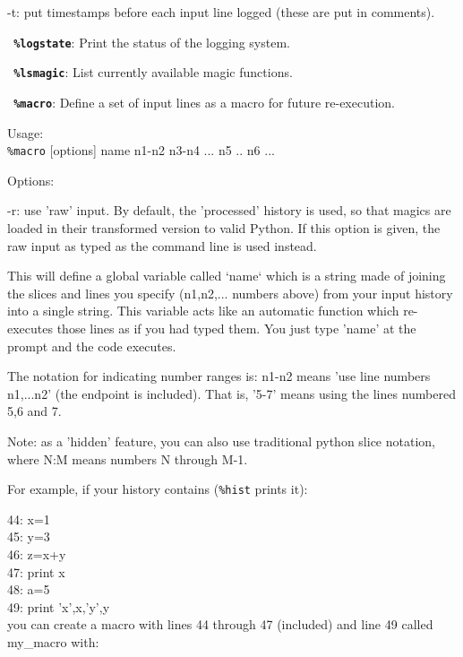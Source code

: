           -t: put timestamps before each input line logged (these are put in
          comments).

\bigskip
\texttt{\textbf{ \%logstate}}:
	Print the status of the logging system.

\bigskip
\texttt{\textbf{ \%lsmagic}}:
	List currently available magic functions.

\bigskip
\texttt{\textbf{ \%macro}}:
	Define a set of input lines as a macro for future re-execution.

        Usage:\\
          \texttt{\%macro} [options] name n1-n2 n3-n4 ... n5 .. n6 ...

        Options:
        
          -r: use 'raw' input.  By default, the 'processed' history is used,
          so that magics are loaded in their transformed version to valid
          Python.  If this option is given, the raw input as typed as the
          command line is used instead.

        This will define a global variable called `name` which is a string
        made of joining the slices and lines you specify (n1,n2,... numbers
        above) from your input history into a single string. This variable
        acts like an automatic function which re-executes those lines as if
        you had typed them. You just type 'name' at the prompt and the code
        executes.

        The notation for indicating number ranges is: n1-n2 means 'use line
        numbers n1,...n2' (the endpoint is included).  That is, '5-7' means
        using the lines numbered 5,6 and 7.

        Note: as a 'hidden' feature, you can also use traditional python slice
        notation, where N:M means numbers N through M-1.

        For example, if your history contains (\texttt{\%hist} prints it):
        
          44: x=1\\
          45: y=3\\
          46: z=x+y\\
          47: print x\\
          48: a=5\\
          49: print 'x',x,'y',y\\

        you can create a macro with lines 44 through 47 (included) and line 49
        called my\_macro with:

